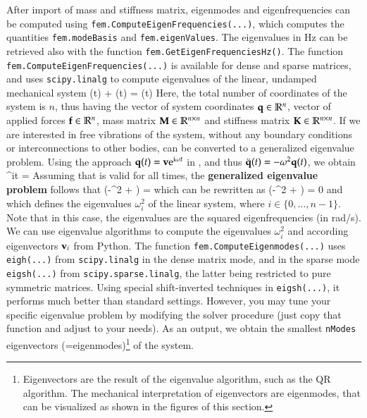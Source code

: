 After import of mass and stiffness matrix, eigenmodes and eigenfrequencies can be computed using \texttt{fem.ComputeEigenFrequencies(...)}, 
which computes the quantities \texttt{fem.modeBasis} and \texttt{fem.eigenValues}.
The eigenvalues in Hz can be retrieved also with the function \texttt{fem.GetEigenFrequenciesHz()}.
The function \texttt{fem.ComputeEigenFrequencies(...)} is available for dense and sparse matrices, and uses \texttt{scipy.linalg} to compute eigenvalues of the linear, undamped mechanical system
\be \label{theory:eigenmodes:EOM}
	\Mm \ddot \qv(t) + \Km \qv(t) = \fv(t) \eqDot
\ee
Here, the total number of coordinates of the system is $n$, 
thus having the vector of system coordinates $\mathbf{q} \in \mathbb{R}^n$, 
vector of applied forces $\mathbf{f} \in \mathbb{R}^n$, 
mass matrix $\mathbf{M} \in \mathbb{R}^{n \times n}$ and stiffness matrix $\mathbf{K} \in \mathbb{R}^{n \times n}$. 
If we are interested in free vibrations of the system, without any boundary conditions or interconnections to other bodies,  can be converted to a generalized eigenvalue problem. Using the approach 
$\mathbf{q}(t) = \mathbf{v} \mathrm{e}^{\mathrm{i} \omega t}$ in , and thus $\ddot {\mathbf{q}}(t) = -\omega^2 \mathbf{q}(t)$, we obtain
\be \label{theory:eigenmodes:harmonicEquation}
		\left[ \left(-\omega^2 \Mm + \Km \right) \vv \right] ^{i\omega t} = \Null \eqDot
\ee
Assuming that  is valid for all times, the {\bf generalized eigenvalue problem} follows that
\be \label{theory:eigenmodes:GEP}
	\left(-\omega^2 \Mm + \Km \right) \vv = \Null \eqComma
\ee
which can be rewritten as
\be \label{theory:eigenmodes:GEP2}
	\det \left(-\omega^2 \Mm + \Km \right) = 0 \eqComma
\ee
and which defines the eigenvalues $\omega_i^2$ of the linear system, where $i \in \{0, \ldots, n-1\}$. Note that in this case, the eigenvalues are the squared eigenfrequencies (in rad/s).
We can use eigenvalue algorithms to compute the eigenvalues $\omega_i^2$ and according eigenvectors $\mathbf{v}_i$ from Python.
The function \texttt{fem.ComputeEigenmodes(...)} uses \texttt{eigh(...)} from \texttt{scipy.linalg} in the dense matrix mode, 
and in the sparse mode \texttt{eigsh(...)} from \texttt{scipy.sparse.linalg}, the latter being restricted to pure symmetric matrices.
Using special shift-inverted techniques in \texttt{eigsh(...)}, it performs much better than standard settings. However, you may tune your specific eigenvalue problem by modifying the solver procedure (just copy that function and adjust to your needs).
As an output, we obtain the smallest \texttt{nModes} eigenvectors (=eigenmodes)\footnote{Eigenvectors are the result of the eigenvalue algorithm, such as the QR algorithm. The mechanical interpretation of eigenvectors are eigenmodes, that can be visualized as shown in the figures of this section.} of the system.
